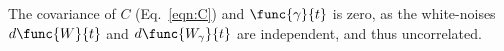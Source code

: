 The covariance of $C$ (Eq.~\ref{eqn:C}) and $\func{\gamma}{t}$ is zero, as the white-noises $d\func{W}{t}$ and $d\func{W_{\gamma}}{t}$ are independent, and thus uncorrelated.